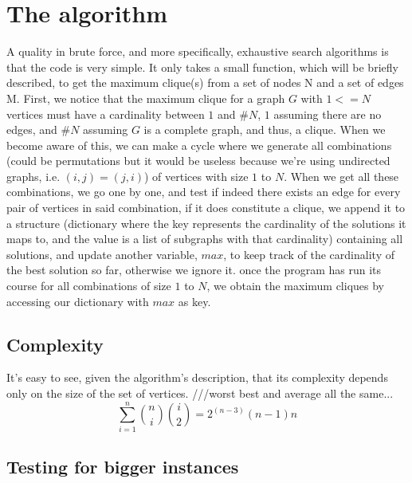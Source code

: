 \documentclass[...]{revdetua}
\begin{document}
\section{The algorithm}
A quality in brute force, and more specifically, exhaustive search algorithms is that the code is very simple.
It only takes a small function, which will be briefly described, to get the maximum clique(s) from a set of nodes N and a set of edges M.
First, we notice that the maximum clique for a graph $G$ with $1<=N$ vertices must have a cardinality between $1$ and $\#N$, $1$ assuming there are no edges, and $\#N$ assuming $G$ is a complete graph, and thus, a clique.
When we become aware of this, we can make a cycle where we generate all combinations (could be permutations but it would be useless because we're using undirected graphs, i.e. $(i,j)=(j,i)$) of vertices with size $1$ to $N$.
When we get all these combinations, we go one by one, and test if indeed there exists an edge for every pair of vertices in said combination, if it does constitute a clique, we append it to a structure (dictionary where the key represents the cardinality of the solutions it maps to, and the value is a list of subgraphs with that cardinality) containing all solutions, and update another variable, $max$, to keep track of the cardinality of the best solution so far, otherwise we ignore it.
once the program has run its course for all combinations of size $1$ to $N$, we obtain the maximum cliques by accessing our dictionary with $max$ as key.
	
\subsection{Complexity}
It's easy to see, given the algorithm's description, that its complexity depends only on the size of the set of vertices. ///worst best and average all the same...
$$\sum_{i=1}^{n}{{n}\choose{i}}{{i}\choose{2}}=2^{(n-3)}(n-1)n$$
\subsection{Testing for bigger instances}
\end{document}
